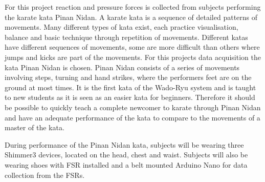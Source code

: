 For this project reaction and pressure forces is collected from subjects performing the karate kata Pinan Nidan. %
A karate kata is a sequence of detailed patterns of movements. Many different types of kata exist, each practice visualisation, balance and basic technique through repetition of movements. Different katas have different sequences of movements, some are more difficult than others where jumps and kicks are part of the movements. For this projects data acquisition the kata Pinan Nidan is chosen. Pinan Nidan consists of a series of movements involving steps, turning and hand strikes, where the performers feet are on the ground at most times. It is the first kata of the Wado-Ryu system and is taught to new students as it is seen as an easier kata for beginners. \cite{Mccarthy1987} Therefore it should be possible to quickly teach a complete newcomer to karate through Pinan Nidan and have an adequate performance of the kata to compare to the movements of a master of the kata. 

During performance of the Pinan Nidan kata, subjects will be wearing three Shimmer3 devices, located on the head, chest and waist. Subjects will also be wearing shoes with FSR installed and a belt mounted Arduino Nano for data collection from the FSRs. 
